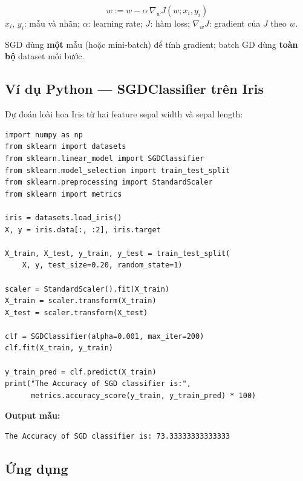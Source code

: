 \begin{phuongphap}[title={Cập nhật trọng số}]
\[
w := w - \alpha \, \nabla_w J(w; x_i, y_i)
\]
$x_i$, $y_i$: mẫu và nhãn; $\alpha$: learning rate; $J$: hàm loss; $\nabla_w J$: gradient của $J$ theo $w$.
\end{phuongphap}

\begin{luuy}[title={Khác batch gradient descent}]
SGD dùng \textbf{một} mẫu (hoặc mini-batch) để tính gradient; batch GD dùng \textbf{toàn bộ} dataset mỗi bước.
\end{luuy}

\subsection{Ví dụ Python --- SGDClassifier trên Iris}

\begin{vidu}[title={Triển khai đầy đủ}]
Dự đoán loài hoa Iris từ hai feature sepal width và sepal length:

\begin{lstlisting}
import numpy as np
from sklearn import datasets
from sklearn.linear_model import SGDClassifier
from sklearn.model_selection import train_test_split
from sklearn.preprocessing import StandardScaler
from sklearn import metrics

iris = datasets.load_iris()
X, y = iris.data[:, :2], iris.target

X_train, X_test, y_train, y_test = train_test_split(
    X, y, test_size=0.20, random_state=1)

scaler = StandardScaler().fit(X_train)
X_train = scaler.transform(X_train)
X_test = scaler.transform(X_test)

clf = SGDClassifier(alpha=0.001, max_iter=200)
clf.fit(X_train, y_train)

y_train_pred = clf.predict(X_train)
print("The Accuracy of SGD classifier is:",
      metrics.accuracy_score(y_train, y_train_pred) * 100)
\end{lstlisting}

\textbf{Output mẫu:}
\begin{verbatim}
The Accuracy of SGD classifier is: 73.33333333333333
\end{verbatim}
\end{vidu}

\subsection{Ứng dụng}

